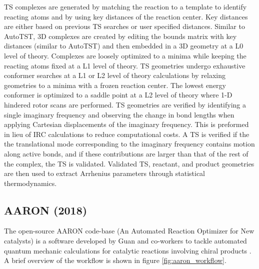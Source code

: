 \documentclass[preprint, 11pt]{elsarticle} %
\begin{document}
TS complexes are generated by matching the reaction to a template to identify reacting atoms and by using key distances of the reaction center. 
Key distances are either based on previous TS searches or user specified distances.
Similar to AutoTST, 3D complexes are created by editing the bounds matrix with key distances (similar to AutoTST) and then embedded in  a 3D geometry at a L0 level of theory.
Complexes are loosely optimized to a minima while keeping the reacting atoms fixed at a L1 level of theory.
TS geometries undergo exhaustive conformer searches at a L1 or L2 level of theory calculations by relaxing geometries to a minima with a frozen reaction center.
The lowest energy conformer is optimized to a saddle point at a L2 level of theory where 1-D hindered rotor scans are performed. 
TS geometries are verified by identifying a single imaginary frequency and observing the change in bond lengths when applying Cartesian displacements of the imaginary frequency.
This is preformed in lieu of  IRC calculations to reduce computational costs.
A TS is verified if the the translational mode corresponding to the imaginary frequency contains motion along active bonds, and if these contributions are larger than that of the rest of the complex, the TS is validated. 
Validated TS, reactant, and product geometries are then used to extract Arrhenius parameters through statistical thermodynamics.


\subsection{AARON (2018)}

The open-source AARON code-base (An Automated Reaction Optimizer for New catalysts) is a software developed by Guan and co-workers to tackle automated quantum mechanic calculations for catalytic reactions involving chiral products \cite{Guan:2018}. 
A brief overview of the workflow is shown in figure \ref{fig:aaron_workflow}.
\end{document}
